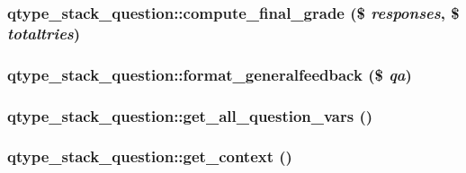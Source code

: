\label{classqtype__stack__question_a5e40ef30933689b56c1d4a0f00f9190f}
\hypertarget{classqtype__stack__question_ad579afb9519f953ba588d12472e351bd}{
\subsubsection[{compute\_\-final\_\-grade}]{\setlength{\rightskip}{0pt plus 5cm}qtype\_\-stack\_\-question::compute\_\-final\_\-grade (\$ {\em responses}, \/  \$ {\em totaltries})}}
\label{classqtype__stack__question_ad579afb9519f953ba588d12472e351bd}
\hypertarget{classqtype__stack__question_a026f32da73f92f604833d001e33d3473}{
\subsubsection[{format\_\-generalfeedback}]{\setlength{\rightskip}{0pt plus 5cm}qtype\_\-stack\_\-question::format\_\-generalfeedback (\$ {\em qa})}}
\label{classqtype__stack__question_a026f32da73f92f604833d001e33d3473}
\hypertarget{classqtype__stack__question_abd4b304221b1aa33c536430efc995301}{
\subsubsection[{get\_\-all\_\-question\_\-vars}]{\setlength{\rightskip}{0pt plus 5cm}qtype\_\-stack\_\-question::get\_\-all\_\-question\_\-vars ()}}
\label{classqtype__stack__question_abd4b304221b1aa33c536430efc995301}
\hypertarget{classqtype__stack__question_a6d3e2e228c2b6af0f5db437f0ea1fbda}{
\subsubsection[{get\_\-context}]{\setlength{\rightskip}{0pt plus 5cm}qtype\_\-stack\_\-question::get\_\-context ()}}
